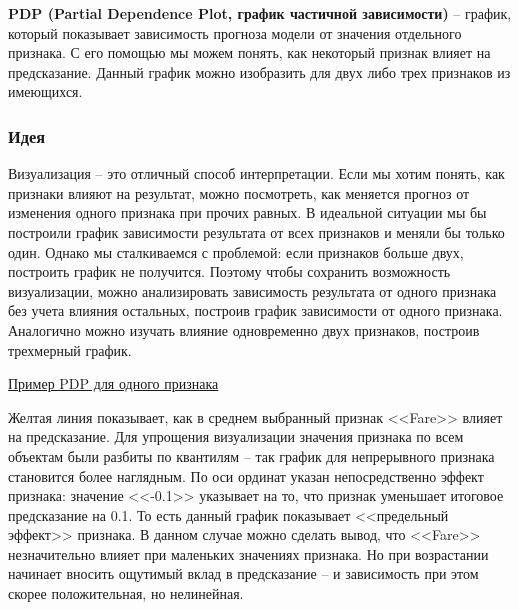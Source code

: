 \textbf{PDP (Partial Dependence Plot, график частичной зависимости)} -- график, который показывает зависимость прогноза модели от значения отдельного признака. С его помощью мы можем понять, как некоторый признак влияет на предсказание. Данный график можно изобразить для двух либо трех признаков из имеющихся.

\subsubsection{Идея}
Визуализация -- это отличный способ интерпретации. Если мы хотим понять, как признаки влияют на результат, можно посмотреть, как меняется прогноз от изменения одного признака при прочих равных. В идеальной ситуации мы бы построили график зависимости результата от всех признаков и меняли бы только один. Однако мы сталкиваемся с проблемой: если признаков больше двух, построить график не получится. Поэтому чтобы сохранить возможность визуализации, можно анализировать зависимость результата от одного признака без учета влияния остальных, построив график зависимости от одного признака. Аналогично можно изучать влияние одновременно двух признаков, построив трехмерный график.

\underline{Пример PDP для одного признака}
\vspace{-7mm}

\begin{figure}[h]
\end{figure}

Желтая линия показывает, как в среднем выбранный признак <<Fare>> влияет на предсказание. Для упрощения визуализации значения признака по всем объектам были разбиты по квантилям -- так график для непрерывного признака становится более наглядным. По оси ординат указан непосредственно эффект признака: значение <<-0.1>> указывает на то, что признак уменьшает итоговое предсказание на 0.1. То есть данный график показывает <<предельный эффект>> признака. В данном случае можно сделать вывод, что <<Fare>> незначительно влияет при маленьких значениях признака. Но при возрастании начинает вносить ощутимый вклад в предсказание -- и зависимость при этом скорее положительная, но нелинейная.

